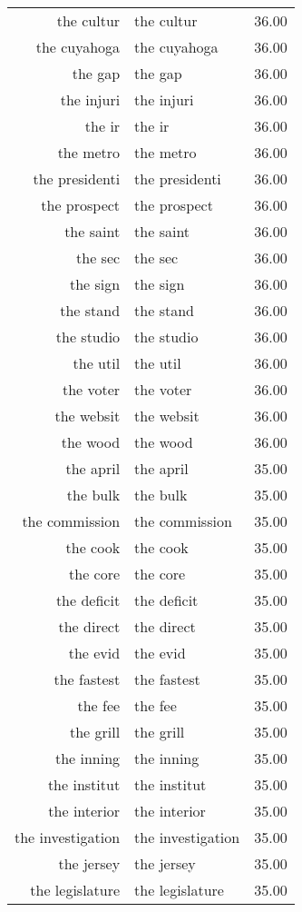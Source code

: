 \begin{table}[ht]
\begin{tabular}{rlr}
  the cultur & the cultur & 36.00 \\ 
  the cuyahoga & the cuyahoga & 36.00 \\ 
  the gap & the gap & 36.00 \\ 
  the injuri & the injuri & 36.00 \\ 
  the ir & the ir & 36.00 \\ 
  the metro & the metro & 36.00 \\ 
  the presidenti & the presidenti & 36.00 \\ 
  the prospect & the prospect & 36.00 \\ 
  the saint & the saint & 36.00 \\ 
  the sec & the sec & 36.00 \\ 
  the sign & the sign & 36.00 \\ 
  the stand & the stand & 36.00 \\ 
  the studio & the studio & 36.00 \\ 
  the util & the util & 36.00 \\ 
  the voter & the voter & 36.00 \\ 
  the websit & the websit & 36.00 \\ 
  the wood & the wood & 36.00 \\ 
  the april & the april & 35.00 \\ 
  the bulk & the bulk & 35.00 \\ 
  the commission & the commission & 35.00 \\ 
  the cook & the cook & 35.00 \\ 
  the core & the core & 35.00 \\ 
  the deficit & the deficit & 35.00 \\ 
  the direct & the direct & 35.00 \\ 
  the evid & the evid & 35.00 \\ 
  the fastest & the fastest & 35.00 \\ 
  the fee & the fee & 35.00 \\ 
  the grill & the grill & 35.00 \\ 
  the inning & the inning & 35.00 \\ 
  the institut & the institut & 35.00 \\ 
  the interior & the interior & 35.00 \\ 
  the investigation & the investigation & 35.00 \\ 
  the jersey & the jersey & 35.00 \\ 
  the legislature & the legislature & 35.00 \\ 

\end{tabular}
\end{table}
